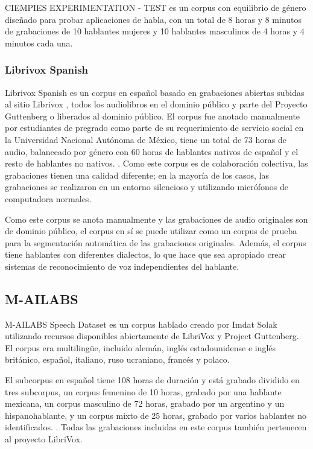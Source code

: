 \documentclass[a4paper,12pt,twoside]{report}
\begin{document}
CIEMPIES EXPERIMENTATION  - TEST es un corpus con equilibrio de género diseñado para probar aplicaciones de habla, con un total de 8 horas y 8 minutos de grabaciones de 10 hablantes mujeres y 10 hablantes masculinos de 4 horas y 4 minutos cada una.

\subsubsection {Librivox Spanish}

Librivox Spanish es un corpus en español basado en grabaciones abiertas subidas al sitio Librivox \cite{LibriVox}, todos los audiolibros en el dominio público y parte del Proyecto Guttenberg \cite{gutenberg} o liberados al dominio público. El corpus fue anotado manualmente por estudiantes de pregrado como parte de su requerimiento de servicio social en la Universidad Nacional Autónoma de México, tiene un total de 73 horas de audio, balanceado por género con 60 horas de hablantes nativos de español y el resto de hablantes no nativos. . Como este corpus es de colaboración colectiva, las grabaciones tienen una calidad diferente; en la mayoría de los casos, las grabaciones se realizaron en un entorno silencioso y utilizando micrófonos de computadora normales.

Como este corpus se anota manualmente y las grabaciones de audio originales son de dominio público, el corpus en sí se puede utilizar como un corpus de prueba para la segmentación automática de las grabaciones originales. Además, el corpus tiene hablantes con diferentes dialectos, lo que hace que sea apropiado crear sistemas de reconocimiento de voz independientes del hablante.

\subsection{M-AILABS}

M-AILABS Speech Dataset es un corpus hablado creado por Imdat Solak utilizando recursos disponibles abiertamente de LibriVox y Project Guttenberg. El corpus era multilingüe, incluido alemán, inglés estadounidense e inglés británico, español, italiano, ruso ucraniano, francés y polaco.

El subcorpus en español tiene 108 horas de duración y está grabado dividido en tres subcorpus, un corpus femenino de 10 horas, grabado por una hablante mexicana, un corpus masculino de 72 horas, grabado por un argentino y un hispanohablante, y un corpus mixto de 25 horas, grabado por varios hablantes no identificados. . Todas las grabaciones incluidas en este corpus también pertenecen al proyecto LibriVox.
\end{document}
